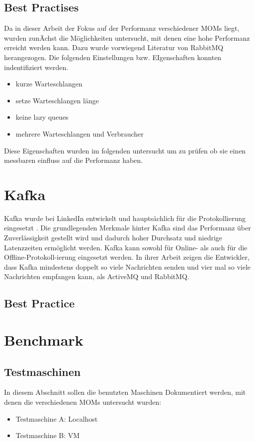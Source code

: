 \subsection{Best Practises}
Da in dieser Arbeit der Fokus auf der Performanz verschiedener MOMs liegt, wurden zunÄchst die Möglichkeiten untersucht, mit denen eine hohe Performanz erreicht werden kann. Dazu wurde vorwiegend Literatur von RabbitMQ herangezogen. Die folgenden Einstellungen bzw. EIgenschaften konnten indentifiziert werden.
\begin{itemize}
    \item kurze Warteschlangen
    \item setze Warteschlangen länge
    \item keine lazy queues
    \item mehrere Warteschlangen und Verbraucher
\end{itemize}
Diese Eigenschaften wurden im folgenden untersucht um zu prüfen ob sie einen messbaren einfluss auf die Performanz haben.

\section{Kafka}
Kafka wurde bei LinkedIn entwickelt und hauptsächlich für die Protokollierung eingesetzt \cite{kafka}. Die grundlegenden Merkmale hinter Kafka sind das Performanz über Zuverlässigkeit gestellt wird und dadurch hoher Durchsatz und niedrige Latenzzeiten ermöglicht werden. Kafka kann sowohl für Online- als auch für die Offline-Protokoll-ierung eingesetzt werden. In ihrer Arbeit zeigen die Entwickler, dass Kafka mindestens doppelt so viele Nachrichten senden und vier mal so viele Nachrichten empfangen kann, als ActiveMQ und RabbitMQ.

\subsection{Best Practice}

\section{Benchmark}

\subsection{Testmaschinen}
\label{sec:testmachine}
In diesem Abschnitt sollen die benutzten Maschinen Dokumentiert werden, mit denen die verschiedenen MOMs untersucht wurden:
\begin{itemize}
    \item Testmaschine A: Localhost
    \item Testmaschine B: VM
\end{itemize}

